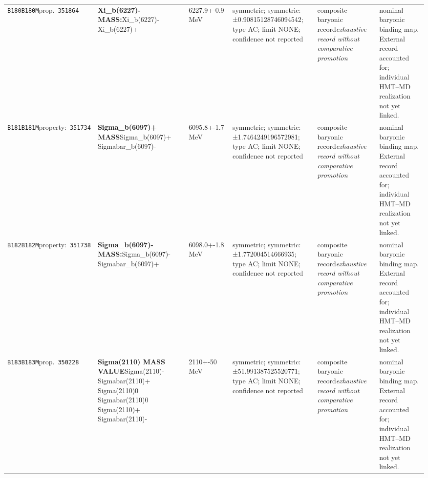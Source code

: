 \begin{landscape}
\begin{longtable}{L{1.85cm}L{4.45cm}L{2.35cm}L{4.05cm}L{3.35cm}L{7.15cm}}
\texttt{B180}\newline \texttt{B180M}\newline prop.\ \texttt{351864} & \textbf{Xi\_\allowbreak{}b(6227)- MASS:}\newline Xi\_\allowbreak{}b(6227)- \textbar{}\allowbreak{} Xi\_\allowbreak{}b(6227)+ & 6227.9+-0.9\,MeV & symmetric; symmetric: ±0.90815128746094542; type AC; limit NONE; confidence not reported & composite baryonic record\newline \emph{exhaustive record without comparative promotion} & nominal baryonic binding map. External record accounted for; individual HMT--MD realization not yet linked. \\
\texttt{B181}\newline \texttt{B181M}\newline property:\ \texttt{351734} & \textbf{Sigma\_\allowbreak{}b(6097)+ MASS}\newline Sigma\_\allowbreak{}b(6097)+ \textbar{}\allowbreak{} Sigmabar\_\allowbreak{}b(6097)- & 6095.8+-1.7\,MeV & symmetric; symmetric: ±1.7464249196572981; type AC; limit NONE; confidence not reported & composite baryonic record\newline \emph{exhaustive record without comparative promotion} & nominal baryonic binding map. External record accounted for; individual HMT--MD realization not yet linked. \\
\texttt{B182}\newline \texttt{B182M}\newline property:\ \texttt{351738} & \textbf{Sigma\_\allowbreak{}b(6097)- MASS:}\newline Sigma\_\allowbreak{}b(6097)- \textbar{}\allowbreak{} Sigmabar\_\allowbreak{}b(6097)+ & 6098.0+-1.8\,MeV & symmetric; symmetric: ±1.772004514666935; type AC; limit NONE; confidence not reported & composite baryonic record\newline \emph{exhaustive record without comparative promotion} & nominal baryonic binding map. External record accounted for; individual HMT--MD realization not yet linked. \\
\texttt{B183}\newline \texttt{B183M}\newline prop.\ \texttt{350228} & \textbf{Sigma(2110) MASS VALUE}\newline Sigma(2110)- \textbar{}\allowbreak{} Sigmabar(2110)+ \textbar{}\allowbreak{} Sigma(2110)0 \textbar{}\allowbreak{} Sigmabar(2110)0 \textbar{}\allowbreak{} Sigma(2110)+ \textbar{}\allowbreak{} Sigmabar(2110)- & 2110+-50\,MeV & symmetric; symmetric: ±51.991387525520771; type AC; limit NONE; confidence not reported & composite baryonic record\newline \emph{exhaustive record without comparative promotion} & nominal baryonic binding map. External record accounted for; individual HMT--MD realization not yet linked. \\

\end{longtable}
\end{landscape}
